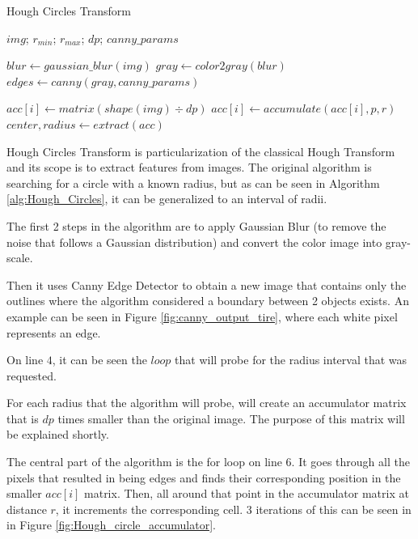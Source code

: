 \begin{algorithm}
    \caption{Hough Circles Transform}\label{alg:Hough_Circles}
    \begin{algorithmic}[1]
        \Require $img$; $r_{min}$; $r_{max}$; $dp$; $canny\_params$

        \State $blur \gets gaussian\_blur(img)$
        \State $gray \gets color2gray(blur)$
        \State $edges \gets canny(gray, canny\_params)$

            \State $acc[i] \gets matrix(shape(img) \div dp)$
                \State $acc[i] \gets accumulate(acc[i], p, r)$
            \EndFor
        \EndFor
    \State $center, radius \gets extract(acc)$
    \end{algorithmic}
\end{algorithm}

Hough Circles Transform is particularization of the classical Hough Transform \cite{site:circular_hough_transform} and its scope is to extract features from images. The original algorithm is searching for a circle with a known radius, but as can be seen in Algorithm \ref{alg:Hough_Circles}, it can be generalized to an interval of radii.

The first 2 steps in the algorithm are to apply Gaussian Blur \cite{site:Gaussian_blur} (to remove the noise that follows a Gaussian distribution) and convert the color image into gray-scale.

Then it uses Canny Edge Detector \cite{site:Canny_edge_detection} to obtain a new image that contains only the outlines where the algorithm considered a boundary between 2 objects exists. An example can be seen in Figure \ref{fig:canny_output_tire}, where each white pixel represents an edge.

On line $4$, it can be seen the $loop$ that will probe for the radius interval that was requested.

For each radius that the algorithm will probe, will create an accumulator matrix that is $dp$ times smaller than the original image. The purpose of this matrix will be explained shortly.

The central part of the algorithm is the for loop on line $6$. It goes through all the pixels that resulted in being edges and finds their corresponding position in the smaller $acc[i]$ matrix. Then, all around that point in the accumulator matrix at distance $r$, it increments the corresponding cell. 3 iterations of this can be seen in in Figure \ref{fig:Hough_circle_accumulator}.

